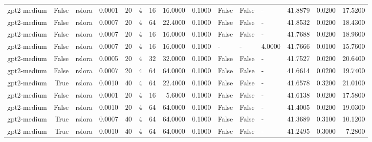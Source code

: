 \begin{tabular}{lrlrrrrrrlllrrr}
gpt2-medium & False & rslora & 0.0001 & 20 & 4 & 16 & 16.0000 & 0.1000 & False & False & - & 41.8879 & 0.0200 & 17.5200 \\
gpt2-medium & False & rslora & 0.0007 & 20 & 4 & 64 & 22.4000 & 0.1000 & False & False & - & 41.8532 & 0.0200 & 18.4300 \\
gpt2-medium & False & rslora & 0.0007 & 20 & 4 & 16 & 16.0000 & 0.1000 & False & False & - & 41.7688 & 0.0200 & 18.9600 \\
gpt2-medium & False & rslora & 0.0007 & 20 & 4 & 16 & 16.0000 & 0.1000 & - & - & 4.0000 & 41.7666 & 0.0100 & 15.7600 \\
gpt2-medium & False & rslora & 0.0005 & 20 & 4 & 32 & 32.0000 & 0.1000 & False & False & - & 41.7527 & 0.0200 & 20.6400 \\
gpt2-medium & False & rslora & 0.0007 & 20 & 4 & 64 & 64.0000 & 0.1000 & False & False & - & 41.6614 & 0.0200 & 19.7400 \\
gpt2-medium & True & rslora & 0.0010 & 40 & 4 & 64 & 22.4000 & 0.1000 & False & False & - & 41.6578 & 0.3200 & 21.0100 \\
gpt2-medium & False & rslora & 0.0001 & 20 & 4 & 16 & 5.6000 & 0.1000 & False & False & - & 41.6138 & 0.0200 & 17.5800 \\
gpt2-medium & False & rslora & 0.0010 & 20 & 4 & 64 & 64.0000 & 0.1000 & False & False & - & 41.4005 & 0.0200 & 19.0300 \\
gpt2-medium & True & rslora & 0.0007 & 40 & 4 & 64 & 64.0000 & 0.1000 & False & False & - & 41.3689 & 0.3100 & 10.1200 \\
gpt2-medium & True & rslora & 0.0010 & 40 & 4 & 64 & 64.0000 & 0.1000 & False & False & - & 41.2495 & 0.3000 & 7.2800 \\
\bottomrule
\end{tabular}
